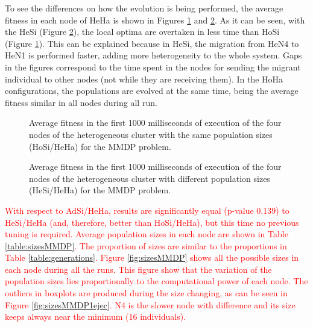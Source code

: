\documentclass[final,1p,times]{elsarticle}
\begin{document}
To see the differences on how the evolution is being performed, the average fitness in each node of HeHa is shown in Figures \ref{fig:hosiheha} and \ref{fig:hesiheha}. As it can be seen, with the HeSi (Figure \ref{fig:hesiheha}), the local optima are overtaken in less time than HoSi (Figure \ref{fig:hosiheha}).  This can be explained because in HeSi, the migration from HeN4 to HeN1 is performed faster, adding more heterogeneity to the whole system. Gaps in the figures correspond to the time spent in the nodes for sending the migrant individual to other nodes (not while they are receiving them). In the HoHa configurations, the populations are evolved at the same time, being the average fitness similar in all nodes during all run. %


\begin{figure}[htb]
\centering
{}
\caption{Average fitness in the first 1000 milliseconds of execution of the four nodes of the heterogeneous cluster with the same population sizes (HoSi/HeHa) for the MMDP problem.}
\label{fig:hosiheha}
\end{figure}

\begin{figure}[htb]
\centering
{} %
\caption{Average fitness in the first 1000 milliseconds of execution of the four nodes of the heterogeneous cluster with different population sizes (HeSi/HeHa) for the MMDP problem.}
\label{fig:hesiheha}
\end{figure}

\textcolor{red}{With respect to AdSi/HeHa, results are significantly  equal (p-value 0.139) to HeSi/HeHa (and, therefore, better than HoSi/HeHa), but this time no previous tuning is required.  Average population sizes in each node are shown in Table \ref{table:sizesMMDP}. The proportion of sizes are similar to the proportions in Table \ref{table:generations}. Figure \ref{fig:sizesMMDP} shows all the possible sizes in each node during all the runs. This figure show that the variation of the population sizes lies proportionally to the computational power of each node. The outliers in boxplots are produced during the size changing, as can be seen in Figure \ref{fig:sizesMMDP1ejec}. N4 is the slower node with difference and its size keeps always near the minimum (16 individuals).}
\end{document}
